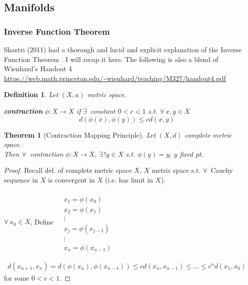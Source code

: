 \documentclass[10pt]{amsart}
\newtheorem{theorem}{Theorem}
\newtheorem{definition}{Definition}
\begin{document}
\begin{multicols*}{2}
\part{Manifolds}


\section{Inverse Function Theorem}

Shastri (2011) had a thorough and lucid and explicit explanation of the Inverse Function Theorem \cite{AShastri2011}.  I will recap it here.  The following is also a blend of Wienhard's Handout 4 \url{https://web.math.princeton.edu/~wienhard/teaching/M327/handout4.pdf}

\begin{definition}
  Let $(X,a)$ metric space.  

\textbf{contraction} $\phi:X \to X$ if $\exists \, $ constant $0<c<1$ s.t. $\forall \, x,y \in X$
\[
d(\phi(x),\phi(y)) \leq cd(x,y)
\]
\end{definition}

\begin{theorem}[Contraction Mapping Principle]
  Let $(X,d)$ complete metric space.  \\
Then $\forall \, $ contraction $\phi:X\to X$, $\exists \, ! y\in X$ s.t. $\phi(y) = y$, $y$ \emph{fixed pt.}
\end{theorem}

\begin{proof}
  Recall def. of complete metric space $X$, $X$ metric space s.t. $\forall \, $ Cauchy sequence in $X$ is convergent in $X$ (i.e. has limit in $X$).  

$\forall \, x_0 \in X$,
Define $\begin{aligned} & \quad \\
  & x_1 = \phi(x_0) \\ 
  & x_2 = \phi(x_1) \\ 
  & \vdots \\
  & x_j = \phi(x_{j-1}) \\ 
  & \vdots \\
  & x_n = \phi(x_{n-1})
\end{aligned}$

\[
\begin{gathered}
  d(x_{n+1},x_n) = d(\phi(x_n),\phi(x_{n-1})) \leq c d(x_n,x_{n-1}) \leq \dots \leq c^nd(x_1,x_0)
\end{gathered}
\]
for some $0< c<1$.


\end{proof}
\end{multicols*}
\end{document}
